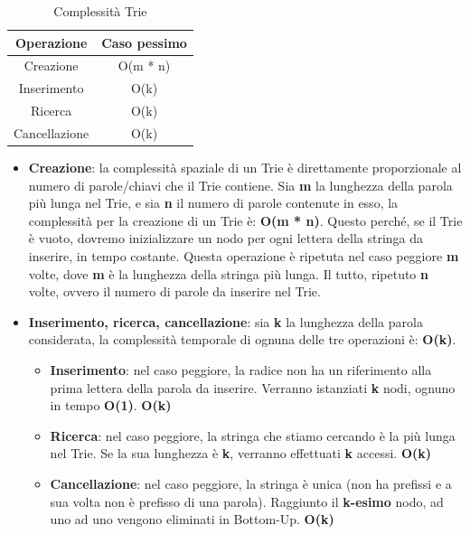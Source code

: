 \documentclass[a4paper, 12pt]{article}
\begin{document}
\begin{table}[th!]
    \centering
    \begin{tabular}{|c|c|}
    \hline
        \textbf{Operazione} & \textbf{Caso pessimo} \\
    \hline
        Creazione & O(m * n) \\ 
    \hline
        Inserimento & O(k) \\
    \hline
        Ricerca & O(k) \\
    \hline
        Cancellazione & O(k) \\
    \hline
    \end{tabular}
    \caption{Complessità Trie}
    \label{tab:my_label}
\end{table}

\begin{itemize}
    \item \textbf{Creazione}: la complessità spaziale di un Trie è direttamente proporzionale al numero di parole/chiavi che il Trie contiene. Sia \textbf{m} la lunghezza della parola più lunga nel Trie, e sia \textbf{n} il numero di parole contenute in esso, la complessità per la creazione di un Trie è: \textbf{O(m * n)}. Questo perché, se il Trie è vuoto, dovremo inizializzare un nodo per ogni lettera della stringa da inserire, in tempo costante. Questa operazione è ripetuta nel caso peggiore \textbf{m} volte, dove \textbf{m} è la lunghezza della stringa più lunga. Il tutto, ripetuto \textbf{n} volte, ovvero il numero di parole da inserire nel Trie.
    
    \item \textbf{Inserimento, ricerca, cancellazione}: sia \textbf{k} la lunghezza della parola considerata, la complessità temporale di ognuna delle tre operazioni è: \textbf{O(k)}.
    \begin{itemize}
        \item \textbf{Inserimento}: nel caso peggiore, la radice non ha un riferimento alla prima lettera della parola da inserire. Verranno istanziati \textbf{k} nodi, ognuno in tempo \textbf{O(1)}. \textbf{O(k)}
        \item \textbf{Ricerca}: nel caso peggiore, la stringa che stiamo cercando è la più lunga nel Trie. Se la sua lunghezza è \textbf{k}, verranno effettuati \textbf{k} accessi. \textbf{O(k)}
        \item \textbf{Cancellazione}: nel caso peggiore, la stringa è unica (non ha prefissi e a sua volta non è prefisso di una parola). Raggiunto il \textbf{k-esimo} nodo, ad uno ad uno vengono eliminati in Bottom-Up. \textbf{O(k)}
    \end{itemize}
\end{itemize}
\end{document}

